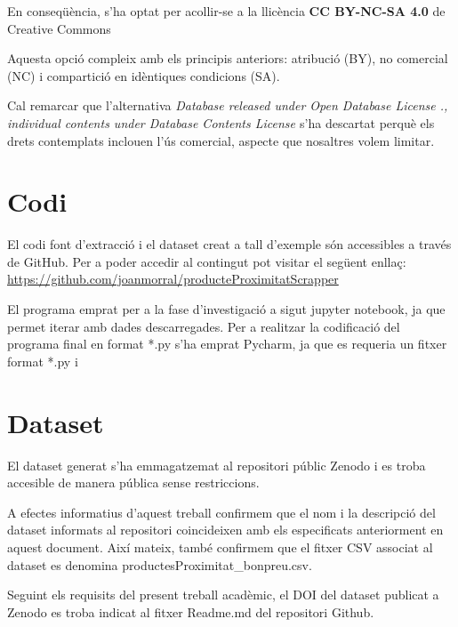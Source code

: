 \documentclass[]{scrartcl}
\begin{document}
En conseqüència, s’ha optat per acollir-se a la llicència \textbf{CC BY-NC-SA 4.0} de Creative Commons \cite{lcc01}

Aquesta opció compleix amb els principis anteriors: atribució (BY), no comercial (NC) i compartició en idèntiques condicions (SA).

Cal remarcar que  l’alternativa \textit{Database released under Open Database License \cite{ODbL01}., individual contents under Database Contents License \cite{DbcL01}} s’ha descartat perquè els drets contemplats inclouen l’ús comercial, aspecte que nosaltres volem limitar.

\section{Codi}
El codi font d'extracció i el dataset creat a tall d'exemple són accessibles a través de GitHub. Per a poder accedir al contingut pot visitar el següent enllaç:
\url{https://github.com/joanmorral/producteProximitatScrapper} 

El programa emprat per a la fase d'investigació a sigut jupyter notebook, ja que permet iterar amb dades descarregades.
Per a realitzar la codificació del programa final en format *.py s'ha emprat Pycharm, ja que es requeria un fitxer format *.py i  

\section{Dataset}
El dataset generat s’ha emmagatzemat al repositori públic Zenodo i es troba accesible de manera pública sense restriccions.

A efectes informatius d’aquest treball confirmem que el nom i la descripció del dataset informats al repositori coincideixen amb els especificats anteriorment en aquest document. Així mateix, també confirmem que el fitxer CSV associat al dataset es denomina productesProximitat\_bonpreu.csv.

Seguint els requisits del present treball acadèmic, el DOI del dataset publicat a Zenodo es troba indicat al fitxer Readme.md del repositori Github.
\end{document}
